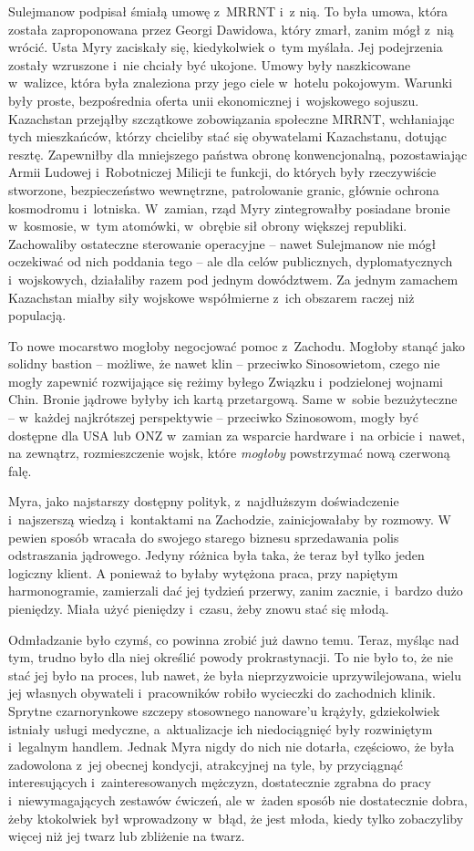 \documentclass[oneside,polish,11pt,sfheadings]{mwbk}
\begin{document}
Sulejmanow podpisał śmiałą umowę z~MRRNT i~z nią. To była umowa, która
została zaproponowana przez Georgi Dawidowa, który zmarł, zanim mógł z~nią wrócić. Usta Myry zaciskały się, kiedykolwiek o~tym myślała. Jej
podejrzenia zostały wzruszone i~nie chciały być ukojone. Umowy były
naszkicowane w~walizce, która była znaleziona przy jego ciele w~hotelu
pokojowym. Warunki były proste, bezpośrednia oferta unii ekonomicznej i~wojskowego sojuszu. Kazachstan przejąłby szczątkowe zobowiązania
społeczne MRRNT, wchłaniając tych mieszkańców, którzy chcieliby stać się
obywatelami Kazachstanu, dotując resztę. Zapewniłby dla mniejszego
państwa obronę konwencjonalną, pozostawiając Armii Ludowej i~Robotniczej
Milicji te funkcji, do których były rzeczywiście stworzone,
bezpieczeństwo wewnętrzne, patrolowanie granic, głównie ochrona
kosmodromu i~lotniska. W~zamian, rząd Myry zintegrowałby posiadane
bronie w~kosmosie, w~tym atomówki, w~obrębie sił obrony większej
republiki. Zachowaliby ostateczne sterowanie operacyjne -- nawet
Sulejmanow nie mógł oczekiwać od nich poddania tego -- ale dla celów
publicznych, dyplomatycznych i~wojskowych, działaliby razem pod jednym
dowództwem. Za jednym zamachem Kazachstan miałby siły wojskowe
współmierne z~ich obszarem raczej niż populacją.

To nowe mocarstwo mogłoby negocjować pomoc z~Zachodu. Mogłoby stanąć
jako solidny bastion -- możliwe, że nawet klin -- przeciwko Sinosowietom,
czego nie mogły zapewnić rozwijające się reżimy byłego Związku i~podzielonej wojnami Chin. Bronie jądrowe byłyby ich kartą przetargową.
Same w~sobie bezużyteczne -- w~każdej najkrótszej perspektywie -- przeciwko Szinosowom, mogły być dostępne dla USA lub ONZ w~zamian za
wsparcie hardware i~na orbicie i~nawet, na zewnątrz, rozmieszczenie
wojsk, które \textit{mogłoby} powstrzymać nową czerwoną falę.

Myra, jako najstarszy dostępny polityk, z~najdłuższym doświadczenie i~najszerszą wiedzą i~kontaktami na Zachodzie, zainicjowałaby by rozmowy.
W pewien sposób wracała do swojego starego biznesu sprzedawania polis
odstraszania jądrowego. Jedyny różnica była taka, że teraz był tylko
jeden logiczny klient. A ponieważ to byłaby wytężona praca, przy
napiętym harmonogramie, zamierzali dać jej tydzień przerwy, zanim
zacznie, i~bardzo dużo pieniędzy. Miała użyć pieniędzy i~czasu, żeby
znowu stać się młodą.

Odmładzanie było czymś, co powinna zrobić już dawno temu. Teraz, myśląc
nad tym, trudno było dla niej określić powody prokrastynacji. To nie
było to, że nie stać jej było na proces, lub nawet, że była
nieprzyzwoicie uprzywilejowana, wielu jej własnych obywateli i~pracowników robiło wycieczki do zachodnich klinik. Sprytne czarnorynkowe
szczepy stosownego nanoware'u krążyły, gdziekolwiek istniały usługi
medyczne, a~aktualizacje ich niedociągnięć były rozwiniętym i~legalnym
handlem. Jednak Myra nigdy do nich nie dotarła, częściowo, że była
zadowolona z~jej obecnej kondycji, atrakcyjnej na tyle, by przyciągnąć
interesujących i~zainteresowanych mężczyzn, dostatecznie zgrabna do
pracy i~niewymagających zestawów ćwiczeń, ale w~żaden sposób nie
dostatecznie dobra, żeby ktokolwiek był wprowadzony w~błąd, że jest
młoda, kiedy tylko zobaczyliby więcej niż jej twarz lub zbliżenie na
twarz.
\end{document}
